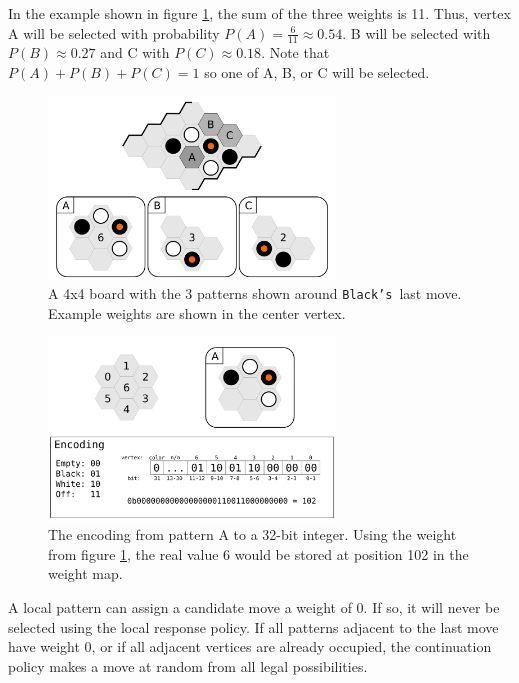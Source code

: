 \documentclass{acm_proc_article-sp}
\newcommand{\blacks}{\texttt{Black's}}
\begin{document}
In the example shown in figure \ref{fig:localpattern}, the sum of the three weights is 11. Thus, vertex A will be selected with probability $P(A) = \frac{6}{11} \approx 0.54$. 
B will be selected with $P(B) \approx 0.27$ and C with $P(C) \approx 0.18$. 
Note that $P(A)+P(B)+P(C) = 1$ so one of A, B, or C will be selected. 

\begin{figure}
	\begin{center}
	\includegraphics[width=3.0in]{graphics/local-pattern.png}
	\caption{A 4x4 board with the 3 patterns shown around \blacks\ last move. Example weights are shown in the center vertex.}
	\label{fig:localpattern}
	\end{center}
\end{figure}

\begin{figure}
	\begin{center}
	\includegraphics[width=3.0in]{graphics/weight-pattern-map.png}
	\caption{The encoding from pattern A to a 32-bit integer. Using the weight from figure \ref{fig:localpattern}, the real value 6 would be stored at position 102 in the weight map.}
	\label{fig:encoding}
	\end{center}
\end{figure}

A local pattern can assign a candidate move a weight of 0. If so, it will never be selected using the local response policy. 
If all patterns adjacent to the last move have weight 0, or if all adjacent vertices are already occupied, 
the continuation policy makes a move at random from all legal possibilities.
\end{document}
